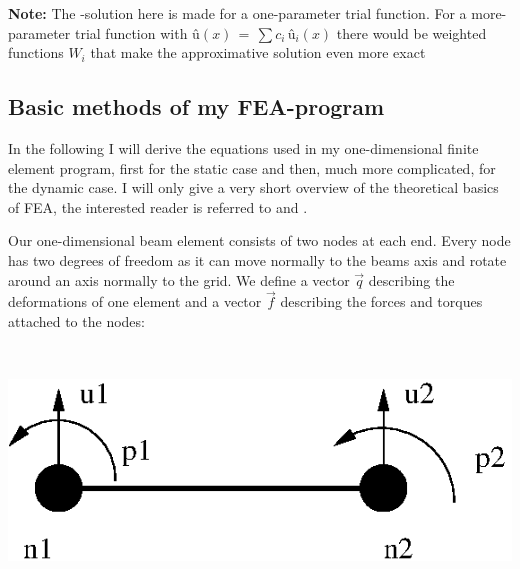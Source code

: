{\bf Note:} The -solution here is made for a one-parameter trial function. For a more-parameter trial function with $û(x)\,=\,\sum c_i\,û_i(x)$ there would be weighted functions $W_i$ that make the approximative solution even more exact
\bigskip 

\subsection{Basic methods of my FEA-program}
In the following I will derive the equations used in my one-dimensional finite element program, first for the static case and then, much more complicated, for the dynamic case. I will only give a very short overview of the theoretical basics of FEA, the interested reader is referred to \cite{seshu} and \cite{ramamurty}.

\bigskip
\bigskip

\begin{minipage}{\textwidth}
    \begin{minipage}[t]{0.5\textwidth}
     
     Our one-dimensional beam element consists of two nodes at each end. Every node has two degrees of freedom as it can move normally to the beams axis and rotate around an axis normally to the grid. We define a vector $\vec{q}$  describing the deformations of one element and a vector $\vec{f}$ describing the forces and torques attached to the nodes:
    \end{minipage}
    \hfill
    \begin{minipage}[t]{0.5\textwidth}				%
      ~\\[-1ex]%
      \centerline{\includegraphics[scale=1]{beamElement1.eps}}
    \end{minipage}
  \end{minipage}

